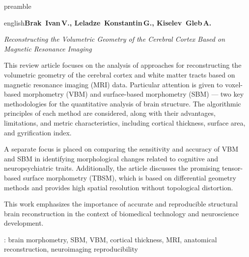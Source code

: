  {preamble}\fancyhead {}\fancyfoot {}
\par \noindent \textbf {}\par \begin {otherlanguage*}{english}\makeatletter \textbf {Brak \,Ivan\unhbox \voidb@x \nobreak \,V.\unskip {}, \ignorespaces Leladze \,Konstantin\unhbox \voidb@x \nobreak \,G.\unskip {}, \ignorespaces Kiselev \,Gleb\unhbox \voidb@x \nobreak \,A.}\makeatother \par \textit {Reconstructing the Volumetric Geometry of the Cerebral Cortex Based on Magnetic Resonance Imaging}\par This review article focuses on the analysis of approaches for reconstructing the volumetric geometry of the cerebral cortex and white matter tracts based on magnetic resonance imaging (MRI) data. Particular attention is given to voxel-based morphometry (VBM) and surface-based morphometry (SBM) — two key methodologies for the quantitative analysis of brain structure. The algorithmic principles of each method are considered, along with their advantages, limitations, and metric characteristics, including cortical thickness, surface area, and gyrification index. \par A separate focus is placed on comparing the sensitivity and accuracy of VBM and SBM in identifying morphological changes related to cognitive and neuropsychiatric traits. Additionally, the article discusses the promising tensor-based surface morphometry (TBSM), which is based on differential geometry methods and provides high spatial resolution without topological distortion. \par This work emphasizes the importance of accurate and reproducible structural brain reconstruction in the context of biomedical technology and neuroscience development. \par \keywordsname : brain morphometry, SBM, VBM, cortical thickness, MRI, anatomical reconstruction, neuroimaging reproducibility \end {otherlanguage*}\par \par \medskip 
